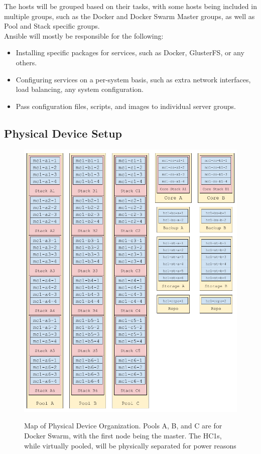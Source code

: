 \documentclass[12pt]{spieman}  %
\begin{document}
The hosts will be grouped based on their tasks, with some hosts being included in multiple groups, such as the Docker and Docker Swarm Master groups, as well as Pool and Stack specific groups.\\

Ansible will mostly be responsible for the following:
\begin{itemize}
\item Installing specific packages for services, such as Docker, GlusterFS, or any others.
\item Configuring services on a per-system basis, such as extra network interfaces, load balancing, any system configuration.
\item Pass configuration files, scripts, and images to individual server groups.
\end{itemize}


\subsection{Physical Device Setup}
\label{subsec:arm-physical-setup}

\begin{figure}[H]
\includegraphics[width=14cm]{images/Pool_Map.png}
\centering
\label{img:pool-map}
\caption{Map of Physical Device Organization. Pools A, B, and C are for Docker Swarm, with the first node being the master. The HC1s, while virtually pooled, will be physically separated for power reasons}
\end{figure}
\end{document}
